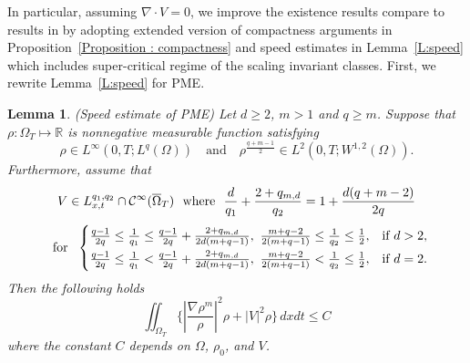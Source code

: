 \documentclass{amsart}
\newtheorem{lemma}[defn]{Lemma}
\numberwithin{equation}{section}
\newcommand{\calC}{{ \mathcal C  }}
\newcommand{\abs}[1]{\left| #1 \right|}
\begin{document}
In particular, assuming $\nabla \cdot V = 0$, we improve the existence results compare to results in \cite[Section~2.1.2]{HKK02} by adopting extended version of compactness arguments in Proposition~\ref{Proposition : compactness} and speed estimates in Lemma~\ref{L:speed} which includes super-critical regime of the scaling invariant classes. First, we rewrite Lemma~\ref{L:speed} for PME.   

\begin{lemma}\label{L:speed:PME} (Speed estimate of PME)
	Let $d\geq 2$, $m>1$ and $q \geq m$.  Suppose that $\rho:\Omega_{T} \mapsto \mathbb{R}$ is nonnegative measurable function satisfying 
	 \begin{equation}\label{FS:PME}
 \rho \in L^{\infty}(0, T; L^{q}(\Omega)) \quad \text{and} \quad
 \rho^{\frac{q+m-1}{2}} \in L^{2}(0, T; W^{1,2}(\Omega)).
 \end{equation}
 Furthermore, assume that 
 \begin{equation}\label{V:speed:PME}
 \begin{gathered}
  V \in L_{x,t}^{q_1, q_2}\cap \calC^{\infty} (\overline{\Omega}_{T})
  \ \text{ where }\ \frac{d}{q_1} + \frac{2 + q_{m,d}}{q_2} = 1+ \frac{d(q+m-2)}{2q} \vspace{1 mm}\\
   \ \text{ for }  \  
\begin{cases}
\frac{q-1}{2q}\leq \frac{1}{q_1} \leq \frac{q-1}{2q} + \frac{2+q_{m,d}}{2d(m+q-1)}, \ \frac{m+q-2}{2(m+q-1)}	\leq \frac{1}{q_2} \leq \frac{1}{2}, & \text{if } d>2, \vspace{1mm}\\
\frac{q-1}{2q}\leq \frac{1}{q_1} < \frac{q-1}{2q} + \frac{2+q_{m,d}}{2d(m+q-1)}, \ \frac{m+q-2}{2(m+q-1)}	< \frac{1}{q_2} \leq \frac{1}{2}, & \text{if } d=2.
\end{cases} 
 \end{gathered}
 \end{equation}
 Then the following holds
 \begin{equation*}
 	\iint_{\Omega_{T}} \{ \abs{\frac{\nabla \rho^m}{\rho}}^2 \rho + \abs{V}^2\rho \} \,dxdt \leq C
\end{equation*}
where the constant $C$ depends on $\Omega$, $\rho_0$, and $V$. 
\end{lemma}
\end{document}
